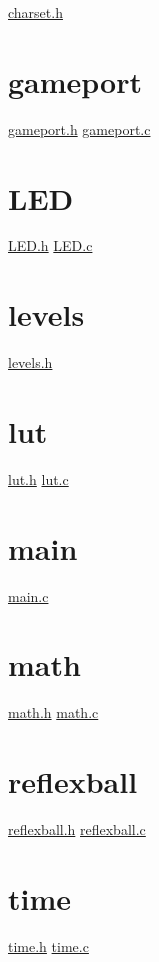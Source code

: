 \underline{charset.h}

\section{gameport}
\label{gameport}

\underline{gameport.h}
\underline{gameport.c}

\section{LED}
\label{LED}

\underline{LED.h}
\underline{LED.c}

\section{levels}
\label{levels}

\underline{levels.h}

\section{lut}
\label{lut}

\underline{lut.h}
\underline{lut.c}

\section{main}
\label{main}

\underline{main.c}

\section{math}
\label{math}

\underline{math.h}
\underline{math.c}

\section{reflexball}
\label{reflexball}

\underline{reflexball.h}
\underline{reflexball.c}

\section{time}
\label{time}

\underline{time.h}
\underline{time.c}
